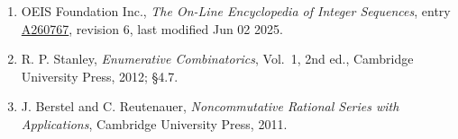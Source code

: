 \documentclass[11pt]{article}
\theoremstyle{definition}
\begin{document}
\begin{enumerate}

\item OEIS Foundation Inc., \emph{The On-Line Encyclopedia of Integer Sequences}, entry \href{https://oeis.org/A260767}{A260767}, revision 6, last modified Jun 02 2025.

\item R. P. Stanley, \emph{Enumerative Combinatorics}, Vol.~1, 2nd ed., Cambridge University Press, 2012; \S4.7.

\item J. Berstel and C. Reutenauer, \emph{Noncommutative Rational Series with Applications}, Cambridge University Press, 2011.

\end{enumerate}
\end{document}
